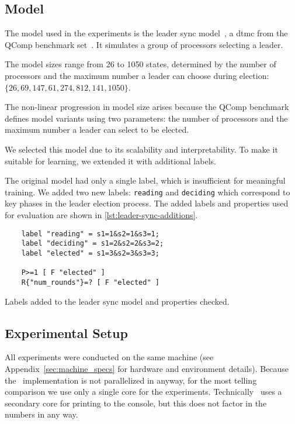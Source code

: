 \subsection{Model}
The model used in the experiments is the leader sync model~\cite{IR90}, a \gls{dtmc} from the QComp benchmark set~\cite{hartmanns2019quantitative}.
It simulates a group of processors selecting a leader.

The model sizes range from 26 to 1050 states, determined by the number of processors and the maximum number a leader can choose during election: $\{26, 69, 147, 61, 274, 812, 141, 1050\}$.

The non-linear progression in model size arises because the QComp benchmark defines model variants using two parameters: the number of processors and the maximum number a leader can select to be elected.

We selected this model due to its scalability and interpretability. To make it suitable for learning, we extended it with additional labels.

The original model had only a single label, which is insufficient for meaningful training.
We added two new labels: \texttt{reading} and \texttt{deciding} which correspond to key phases in the leader election process.
The added labels and properties used for evaluation are shown in \autoref{lst:leader-sync-additions}.

\begin{listing}
    \begin{verbatim}
    label "reading" = s1=1&s2=1&s3=1;
    label "deciding" = s1=2&s2=2&s3=2;
    label "elected" = s1=3&s2=3&s3=3;

    P>=1 [ F "elected" ]
    R{"num_rounds"}=? [ F "elected" ]
    \end{verbatim}
    \caption{Labels added to the leader sync model and properties checked.}
    \label{lst:leader-sync-additions}
\end{listing}

\subsection{Experimental Setup}
All experiments were conducted on the same machine (see Appendix~\ref{sec:machine_specs} for hardware and environment details).
Because the \Cupaal\ implementation is not parallelized in anyway, for the most telling comparison we use only a single core for the experiments.
Technically \Jajapy\ uses a secondary core for printing to the console, but this does not factor in the numbers in any way.

